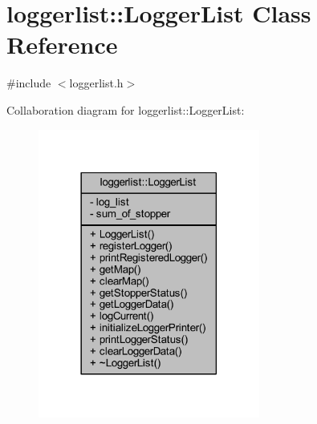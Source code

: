 \hypertarget{classloggerlist_1_1_logger_list}{}\section{loggerlist\+:\+:Logger\+List Class Reference}
\label{classloggerlist_1_1_logger_list}


{\ttfamily \#include $<$loggerlist.\+h$>$}



Collaboration diagram for loggerlist\+:\+:Logger\+List\+:\nopagebreak
\begin{figure}[H]
\begin{center}
\leavevmode
\includegraphics[width=206pt]{classloggerlist_1_1_logger_list__coll__graph}
\end{center}
\end{figure}
